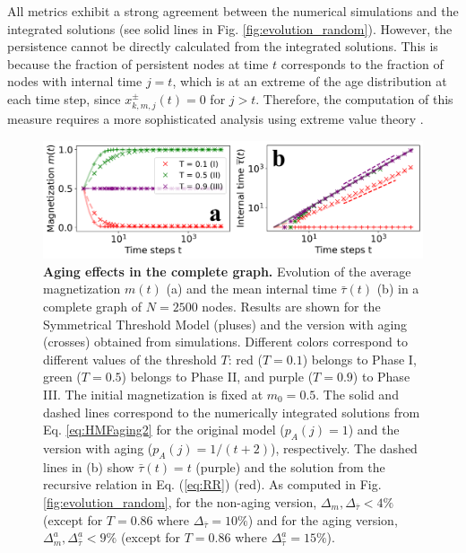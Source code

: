 	All metrics exhibit a strong agreement between the numerical simulations and the integrated solutions (see solid lines in Fig. \ref{fig:evolution_random}). However, the persistence cannot be directly calculated from the integrated solutions. This is because the fraction of persistent nodes at time $t$ corresponds to the fraction of nodes with internal time $j = t$, which is at an extreme of the age distribution at each time step, since $x^{\pm}_{k,m,j}(t) = 0$ for $j > t$. Therefore, the computation of this measure requires a more sophisticated analysis using extreme value theory \cite{haan2006extreme}.
	
	\begin{figure}[t]
		 \centering
		\includegraphics[width=\textwidth]{Figs/Aging_STM/FIG4.pdf}
		\caption{\label{fig:COM_AGING} \textbf{Aging effects in the complete graph.} Evolution of the average magnetization $m(t)$ (a) and the mean internal time $\bar{\tau}(t)$ (b) in a complete graph of $N=2500$ nodes. Results are shown for the Symmetrical Threshold Model (pluses) and the version with aging (crosses) obtained from simulations. Different colors correspond to different values of the threshold $T$: red ($T = 0.1$) belongs to Phase I, green ($T = 0.5$) belongs to Phase II, and purple ($T = 0.9$) to Phase III. The initial magnetization is fixed at $m_0 = 0.5$. The solid and dashed lines correspond to the numerically integrated solutions from Eq. \ref{eq:HMFaging2} for the original model ($p_A(j) = 1$) and the version with aging ($p_A(j) = 1/(t+2)$), respectively. The dashed lines in (b) show $\bar{\tau}(t) = t$ (purple) and the solution from the recursive relation in Eq. (\ref{eq:RR}) (red). 
		As computed in Fig. \ref{fig:evolution_random}, for the non-aging version, $\Delta_{m}, \Delta_{\bar{\tau}}  < 4\%$ (except for $T = 0.86$ where $\Delta_{\bar{\tau}} = 10\%$) and for the aging version, $\Delta_{m}^{a}, \Delta^{a}_{\bar{\tau}} < 9\%$ (except for $T = 0.86$ where $\Delta^{a}_{\bar{\tau}} = 15\%$).}
	\end{figure}
	
